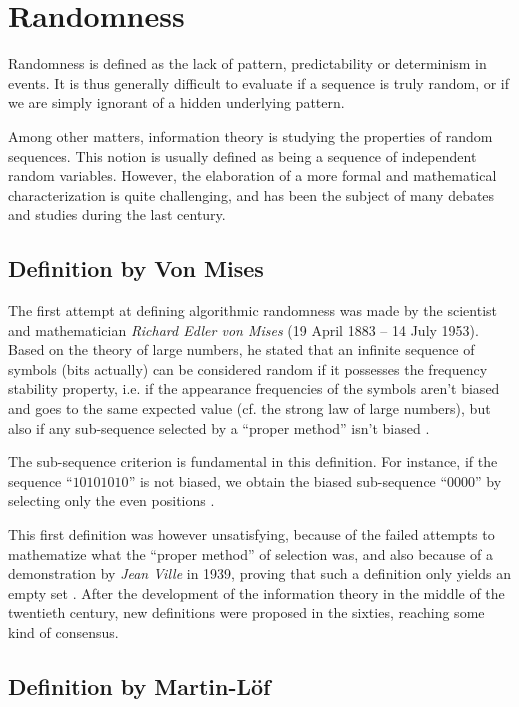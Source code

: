 \documentclass{llncs}
\begin{document}
\section{Randomness}
\label{sec:rand}


Randomness is defined as the lack of pattern, predictability or determinism in events. It is thus generally difficult to evaluate if a sequence is truly random, or if we are simply ignorant of a hidden underlying pattern.

Among other matters, information theory is studying the properties of random sequences. This notion is usually defined as being a sequence of independent random variables. However, the elaboration of a more formal and mathematical characterization is quite challenging, and has been the subject of many debates and studies during the last century.

\subsection{Definition by Von Mises}


The first attempt at defining algorithmic randomness was made by the scientist and mathematician \emph{Richard Edler von Mises} (19 April 1883 – 14 July 1953). Based on the theory of large numbers, he stated that an infinite sequence of symbols (bits actually) can be considered random if it possesses the frequency stability property, i.e. if the appearance frequencies of the symbols aren't biased and goes to the same expected value (cf. the strong law of large numbers), but also if any sub-sequence selected by a ``proper method'' isn't biased \cite{down}.

The sub-sequence criterion is fundamental in this definition. For instance, if the sequence “$10101010$” is not biased, we obtain the biased sub-sequence “$0000$” by selecting only the even positions \cite{down}.

This first definition was however unsatisfying, because of the failed attempts to mathematize what the “proper method” of selection was, and also because of a demonstration by \emph{Jean Ville} in 1939, proving that such a definition only yields an empty set \cite{down}. After the development of the information theory in the middle of the twentieth century, new definitions were proposed in the sixties, reaching some kind of consensus.

\subsection{Definition by Martin-L\"{o}f}
\end{document}
